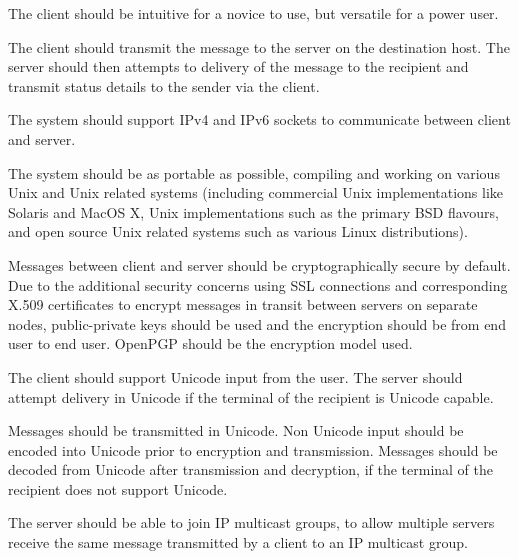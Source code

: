 
The client should be intuitive for a novice to use, but versatile for a
power user.


The client should transmit the message to the server on the destination
host. The server should then attempts to delivery of the message to the
recipient and transmit status details to the sender via the client.


The system should support IPv4 and IPv6 sockets to communicate between
client and server. 


The system should be as portable as possible, compiling and working on 
various Unix and Unix related systems (including commercial Unix
implementations like Solaris and MacOS X, Unix 
implementations such as the primary BSD flavours, and open source Unix
related systems such as various Linux distributions).


Messages between client and server should be cryptographically secure by
default. Due to the additional security concerns using SSL connections
and corresponding X.509 certificates to encrypt messages in transit
between servers on separate nodes, public-private keys should
be used and the encryption should be from end user to end user.
OpenPGP should be the encryption model used.


The client should support Unicode input from the user. The server should 
attempt delivery in Unicode if the terminal of the recipient is Unicode 
capable. 


Messages should be transmitted in Unicode. Non Unicode input should be
encoded into Unicode prior to encryption and transmission. Messages
should be decoded from Unicode after transmission and decryption, if
the terminal of the recipient does not support Unicode. 


The server should be able to join IP multicast groups, to allow multiple
servers receive the same message transmitted by a client to an IP
multicast group. 

